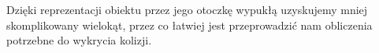 \begin{center}
    \begin{Huge}
        \fontsize{46pt}{46pt}\selectfont{Zastosowania}
    \end{Huge}   
\end{center}
\begin{LARGE}
    Dzięki reprezentacji obiektu przez jego otoczkę wypukłą uzyskujemy mniej skomplikowany wielokąt,
    przez co łatwiej jest przeprowadzić nam obliczenia potrzebne do wykrycia kolizji.
\end{LARGE}
\vspace*{\fill}
\begin{center}
    
\end{center}